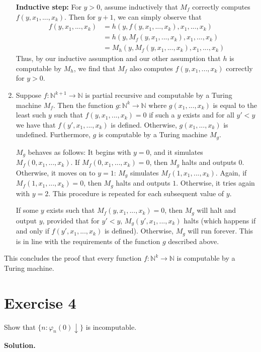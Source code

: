 \documentclass{article}
\newcommand{\nat}{\mathbb{N}}
\newcommand{\solution}{\noindent \textbf{Solution.}}
\begin{document}
\begin{enumerate}
    \textbf{Inductive step:}
    For $y > 0$, assume inductively that $M_f$ correctly computes $f(y, x_1, ..., x_k)$.
    Then for $y + 1$, we can simply observe that
    \begin{align*}
        f(y, x_1, ..., x_k) &= h(y, f(y, x_1, ..., x_k), x_1, ..., x_k) \\
        &= h(y, M_f(y, x_1, ..., x_k), x_1, ..., x_k ) \\
        &= M_h(y, M_f(y, x_1, ..., x_k), x_1, ..., x_k)
    \end{align*}
    Thus, by our inductive assumption and our other assumption that $h$ is computable by $M_h$, we find that $M_f$ also computes $f(y, x_1, ..., x_k)$ correctly for $y > 0$.

    \item Suppose $f:\nat^{k+1} \to \nat$ is partial recursive and computable by a Turing machine $M_f$.
    Then the function $g: \nat^k \to \nat$ where $g(x_1, ..., x_k)$ is equal to the least such $y$ such that $f(y, x_1, ..., x_k) = 0$ if such a $y$ exists and for all $y' < y$ we have that $f(y', x_1, ..., x_k)$ is defined.
    Otherwise, $g(x_1, ..., x_k)$ is undefined.
    Furthermore, $g$ is computable by a Turing machine $M_g$.

    $M_g$ behaves as follows:
    It begins with $y = 0$, and it simulates $M_f(0, x_1, ..., x_k)$.
    If $M_f(0, x_1, ..., x_k) = 0$, then $M_g$ halts and outputs 0.
    Otherwise, it moves on to $y=1$: $M_g$ simulates $M_f(1, x_1, ..., x_k)$.
    Again, if $M_f(1, x_1, ..., x_k) = 0$, then $M_g$ halts and outputs $1$.
    Otherwise, it tries again with $y =2$.
    This procedure is repeated for each subsequent value of $y$.

    If some $y$ exists such that $M_f(y, x_1, ...,x_k) = 0$, then $M_g$ will halt and output $y$, provided that for $y'< y$, $M_g(y', x_1, ..., x_k)$ halts (which happens if and only if $f(y', x_1, ..., x_k)$ is defined).
    Otherwise, $M_g$ will run forever.
    This is in line with the requirements of the function $g$ described above.
\end{enumerate}
This concludes the proof that every function $f: \nat^k \to \nat$ is computable by a Turing machine.

\newpage
\section*{Exercise 4}
Show that $\{n: \varphi_n(0) \downarrow\}$ is incomputable.

\vspace{3mm}
\solution
\end{document}
